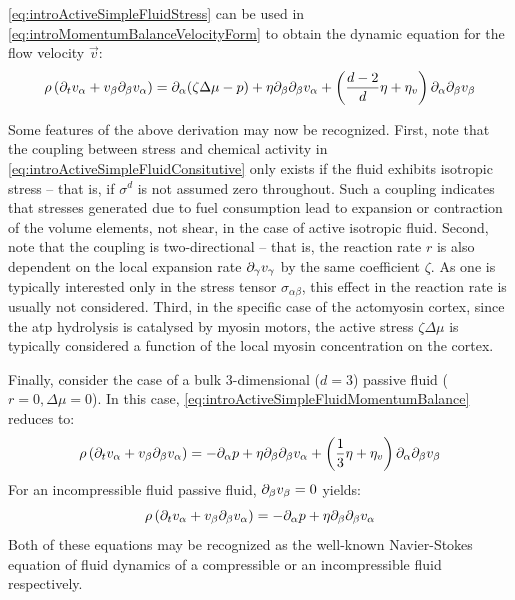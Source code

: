 \autoref{eq:introActiveSimpleFluidStress} can be used in \autoref{eq:introMomentumBalanceVelocityForm} to obtain the dynamic equation for the flow velocity $\vec{v}$:
\begin{equation}\label{eq:introActiveSimpleFluidMomentumBalance}
    \rho\left(\inlinePartial{t}{v_\alpha} + v_\beta\inlinePartial{\beta}{v_\alpha}\right) = \inlinePartial{\alpha}{(\zeta\Delta\mu - p)} + \eta\inlinePartial{\beta}{\inlinePartial{\beta}{v_\alpha}} + \left(\frac{d-2}{d}\eta + \eta_v\right)\inlinePartial{\alpha}{\inlinePartial{\beta}{v_\beta}}
\end{equation}

Some features of the above derivation may now be recognized. First, note that the coupling between stress and chemical activity in \autoref{eq:introActiveSimpleFluidConsitutive} only exists if the fluid exhibits isotropic stress -- that is, if $\sigma^d$ is not assumed zero throughout. Such a coupling indicates that stresses generated due to fuel consumption lead to expansion or contraction of the volume elements, not shear, in the case of active isotropic fluid. Second, note that the coupling is two-directional -- that is, the reaction rate $r$ is also dependent on the local expansion rate $\inlinePartial{\gamma}{v_\gamma}$ by the same coefficient $\zeta$. As one is typically interested only in the stress tensor $\sigma_{\alpha\beta}$, this effect in the reaction rate is usually not considered. Third, in the specific case of the actomyosin cortex, since the \ac{atp} hydrolysis is catalysed by myosin motors, the active stress $\zeta \Delta\mu$ is typically considered a function of the local myosin concentration on the cortex. 

Finally, consider the case of a bulk 3-dimensional ($d=3$) passive fluid ($r = 0, \Delta \mu = 0$). In this case, \autoref{eq:introActiveSimpleFluidMomentumBalance} reduces to:
\begin{equation}\label{eq:introSimpleFluidNavierStokesCompressible}
    \rho\left(\inlinePartial{t}{v_\alpha} + v_\beta\inlinePartial{\beta}{v_\alpha}\right) = -\inlinePartial{\alpha}{p} + \eta\inlinePartial{\beta}{\inlinePartial{\beta}{v_\alpha}} + \left(\frac{1}{3}\eta + \eta_v\right)\inlinePartial{\alpha}{\inlinePartial{\beta}{v_\beta}}
\end{equation}
For an incompressible fluid passive fluid, $\inlinePartial{\beta}{v_\beta} = 0$ yields:
\begin{equation}\label{eq:introSimpleFluidNavierStokesIncompressible}
    \rho\left(\inlinePartial{t}{v_\alpha} + v_\beta\inlinePartial{\beta}{v_\alpha}\right) = -\inlinePartial{\alpha}{p} + \eta\inlinePartial{\beta}{\inlinePartial{\beta}{v_\alpha}}
\end{equation}
Both of these equations may be recognized as the well-known Navier-Stokes equation of fluid dynamics of a compressible or an incompressible fluid respectively.

